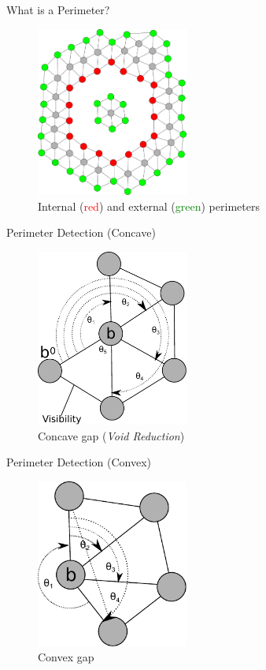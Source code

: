 \documentclass{beamer}
\begin{document}
\begin{frame}{What is a Perimeter?}
  \begin{figure}
    \begin{center}
      \includegraphics[width=5cm]{Perimeters.pdf}
    \end{center}
    \caption{Internal (\textcolor{red}{red}) and external (\textcolor{green}{green}) perimeters}
  \end{figure}
\end{frame}


\begin{frame}{Perimeter Detection (Concave)}
  \begin{figure}
    \begin{center}
      \includegraphics[width=5cm]{Perimeter1.pdf}
    \end{center}
    \caption{Concave gap (\textit{Void Reduction})}
  \end{figure}
\end{frame}

\begin{frame}{Perimeter Detection (Convex)}
  \begin{figure}
    \begin{center}
      \includegraphics[width=5cm]{Perimeter2.pdf}
    \end{center}
    \caption{Convex gap}
  \end{figure}
\end{frame}
\end{document}
